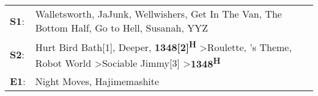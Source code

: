 \begin{supertabular}{p{0.03\textwidth}p{0.92\textwidth}}
 \textbf{S1}:  &                                                            Walletsworth\textsuperscript{}, \enspace JaJunk\textsuperscript{}, \enspace Wellwishers\textsuperscript{}, \enspace Get In The Van\textsuperscript{}, \enspace The Bottom Half\textsuperscript{}, \enspace Go to Hell\textsuperscript{}, \enspace Susanah\textsuperscript{}, \enspace YYZ\textsuperscript{}  \enspace  \\
 \textbf{S2}:  &  Hurt Bird Bath[1]\textsuperscript{}, \enspace Deeper\textsuperscript{}, \enspace \textbf{1348[2]\textsuperscript{H}} \textgreater \enspace Roulette\textsuperscript{}, 's Theme\textsuperscript{}, \enspace Robot World\textsuperscript{} \textgreater \enspace Sociable Jimmy[3]\textsuperscript{} \textgreater \enspace \textbf{1348\textsuperscript{H}}  \enspace  \\
 \textbf{E1}:  &                                                                                                                                                                                                                                                                                                Night Moves\textsuperscript{}, \enspace Hajimemashite\textsuperscript{}  \enspace  \\
\end{supertabular}
